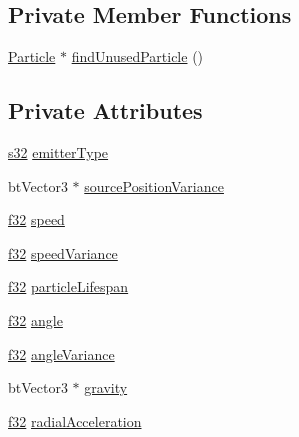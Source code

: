 \subsection*{Private Member Functions}
\begin{DoxyCompactItemize}
\item 
\mbox{\hyperlink{structnjli_1_1_particle_emitter_1_1_particle}{Particle}} $\ast$ \mbox{\hyperlink{classnjli_1_1_particle_emitter_afb4769ebda101a59874157382f83d8b0}{find\+Unused\+Particle}} ()
\end{DoxyCompactItemize}
\subsection*{Private Attributes}
\begin{DoxyCompactItemize}
\item 
\mbox{\hyperlink{_util_8h_aa62c75d314a0d1f37f79c4b73b2292e2}{s32}} \mbox{\hyperlink{classnjli_1_1_particle_emitter_ad5e5baf0ac026383a9867b3363cc2739}{emitter\+Type}}
\item 
bt\+Vector3 $\ast$ \mbox{\hyperlink{classnjli_1_1_particle_emitter_a3bdafb8ef4016ae934405c9c4c8bcfd4}{source\+Position\+Variance}}
\item 
\mbox{\hyperlink{_util_8h_a5f6906312a689f27d70e9d086649d3fd}{f32}} \mbox{\hyperlink{classnjli_1_1_particle_emitter_ae9e09600c828636113e5d61eaa75b4c6}{speed}}
\item 
\mbox{\hyperlink{_util_8h_a5f6906312a689f27d70e9d086649d3fd}{f32}} \mbox{\hyperlink{classnjli_1_1_particle_emitter_ad1bf01d3cca0b18cd035c128e63847f0}{speed\+Variance}}
\item 
\mbox{\hyperlink{_util_8h_a5f6906312a689f27d70e9d086649d3fd}{f32}} \mbox{\hyperlink{classnjli_1_1_particle_emitter_a6b1eecd9579c8c6c3cbe2385e184bbc5}{particle\+Lifespan}}
\item 
\mbox{\hyperlink{_util_8h_a5f6906312a689f27d70e9d086649d3fd}{f32}} \mbox{\hyperlink{classnjli_1_1_particle_emitter_aa727070cd45bb3c6f3452e54b131d48d}{angle}}
\item 
\mbox{\hyperlink{_util_8h_a5f6906312a689f27d70e9d086649d3fd}{f32}} \mbox{\hyperlink{classnjli_1_1_particle_emitter_a9fd84a1995712fafed4a6620a34ce597}{angle\+Variance}}
\item 
bt\+Vector3 $\ast$ \mbox{\hyperlink{classnjli_1_1_particle_emitter_a0b93b2b2a3066c4796a3dd17a7003bde}{gravity}}
\item 
\mbox{\hyperlink{_util_8h_a5f6906312a689f27d70e9d086649d3fd}{f32}} \mbox{\hyperlink{classnjli_1_1_particle_emitter_a24cf0fb59a04493a9d2207eefa0e5fe6}{radial\+Acceleration}}

\end{DoxyCompactItemize}
